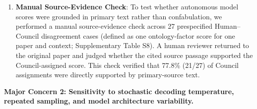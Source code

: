 \documentclass[11pt]{article}
\newcommand{\reviewercomment}[1]{\vspace{1em}\noindent\textbf{\color{blue!80!black}#1}\vspace{0.4em}}
\begin{document}
\begin{enumerate}[leftmargin=*,noitemsep]
\item \textbf{Manual Source-Evidence Check}: 
To test whether autonomous model scores were grounded in primary text rather than confabulation, we performed a manual source-evidence check across 27 prespecified Human--Council disagreement cases (defined as one ontology-factor score for one paper and context; Supplementary Table S8). A human reviewer returned to the original paper and judged whether the cited source passage supported the Council-assigned score. This check verified that 77.8\% (21/27) of Council assignments were directly supported by primary-source text.
\end{enumerate}

\reviewercomment{Major Concern 2: Sensitivity to stochastic decoding temperature, repeated sampling, and model architecture variability.}
\end{document}
